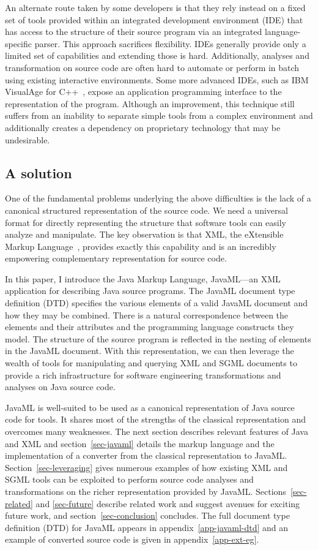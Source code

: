 \documentclass{article}
\begin{document}
An alternate route taken by some developers is that they rely instead on
a fixed set of tools provided within an integrated development
environment (IDE) that has access to the structure of their source
program via an integrated language-specific parser.  This approach
sacrifices flexibility.  IDEs generally provide only a limited set of
capabilities and extending those is hard.  Additionally, analyses and
transformation on source code are often hard to automate or perform in
batch using existing interactive environments.  Some more advanced IDEs,
such as IBM VisualAge for C++~\cite{Soroker97}, expose an application
programming interface to the representation of the program.  Although an
improvement, this technique still suffers from an inability to separate
simple tools from a complex environment and additionally creates a
dependency on proprietary technology that may be undesirable.

\subsection{A solution}

One of the fundamental problems underlying the above difficulties is the
lack of a canonical structured representation of the source code.  We
need a universal format for directly representing the structure that
software tools can easily analyze and manipulate.  The key observation
is that XML, the eXtensible Markup Language~\cite{XML}, provides exactly
this capability and is an incredibly empowering complementary
representation for source code.

In this paper, I introduce the Java Markup Language, JavaML---an XML
application for describing Java source programs.  The JavaML document
type definition (DTD) specifies the various elements of a valid JavaML
document and how they may be combined.  There is a natural
correspondence between the elements and their attributes and the
programming language constructs they model.  The structure of the source
program is reflected in the nesting of elements in the JavaML document.
With this representation, we can then leverage the wealth of tools for
manipulating and querying XML and SGML documents to provide a rich
infrastructure for software engineering transformations and analyses on
Java source code.

JavaML is well-suited to be used as a canonical representation of Java
source code for tools.  It shares most of the strengths of the classical
representation and overcomes many weaknesses.  The next section
describes relevant features of Java and XML and section~\ref{sec-javaml}
details the markup language and the implementation of a converter from
the classical representation to JavaML.  Section~\ref{sec-leveraging}
gives numerous examples of how existing XML and SGML tools can be
exploited to perform source code analyses and transformations on the
richer representation provided by JavaML.  Sections~\ref{sec-related}
and \ref{sec-future} describe related work and suggest avenues for
exciting future work, and section~\ref{sec-conclusion} concludes.  The
full document type definition (DTD) for JavaML appears in
appendix~\ref{app-javaml-dtd} and an example of converted source code is
given in appendix~\ref{app-ext-eg}.
\end{document}
